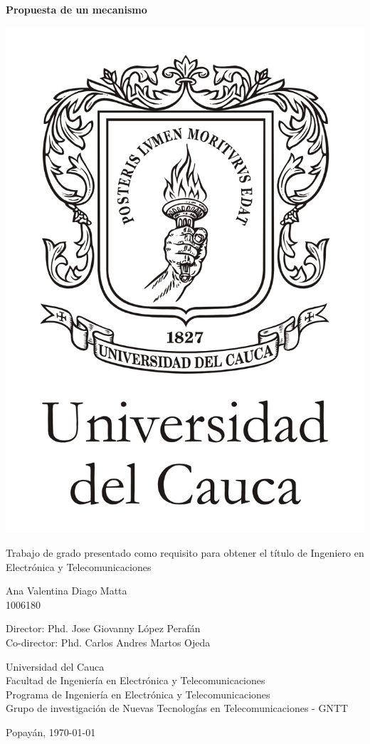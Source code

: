 \newpage
\thispagestyle{empty}

\begin{center}

    {\textbf{\large Propuesta de un mecanismo  }}\\
    \vfill

    \includegraphics[scale=0.45]{img/logo-unicauca-n.jpg} \\
    \vfill

    Trabajo de grado presentado como requisito para obtener el título de Ingeniero en Electrónica y Telecomunicaciones\\
    \vfill
    
    Ana Valentina Diago Matta\\
    1006180 \\
    \vfill
    
    Director: Phd. Jose Giovanny López Perafán \\
    Co-director: Phd. Carlos Andres Martos Ojeda \\
    \vfill

    \vfill
    Universidad del Cauca\\
    Facultad de Ingeniería en Electrónica y Telecomunicaciones\\
    Programa de Ingeniería en Electrónica y Telecomunicaciones\\
    Grupo de investigación de Nuevas Tecnologías en Telecomunicaciones - GNTT\\
    \date{\today}
    Popayán, \today
\end{center} 
